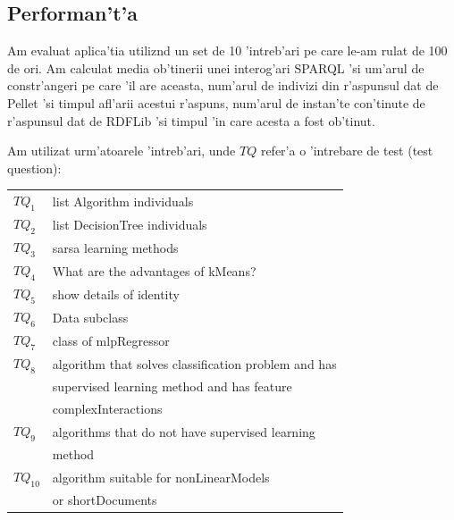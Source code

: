 \documentclass[12pt,a4paper,twoside]{report}
\begin{document}
\subsection{Performan't'a}

Am evaluat aplica'tia utiliz\ia nd un set de 10 'intreb'ari pe care le-am rulat de 100 de ori. Am calculat media ob'tinerii unei interog'ari SPARQL 'si um'arul de constr'angeri pe care 'il are aceasta, num'arul de indivizi din r'aspunsul dat de Pellet 'si timpul afl'arii acestui r'aspuns, num'arul de instan'te con'tinute de r'aspunsul dat de RDFLib 'si timpul 'in care acesta a fost ob'tinut. 

Am utilizat urm'atoarele 'intreb'ari, unde $TQ$ refer'a o 'intrebare de test (test question):
\newline

\begin{small}
\begin{tabular}{ll}
$TQ_1$ & list Algorithm individuals\\
$TQ_2$ & list DecisionTree individuals\\
$TQ_3$ & sarsa learning methods\\
$TQ_4$ & What are the advantages of kMeans?\\
$TQ_5$ & show details of identity\\
$TQ_6$ & Data subclass\\
$TQ_7$ & class of mlpRegressor\\
$TQ_8$ & algorithm that solves classification problem and has\\
 & supervised learning method and has feature \\
 & complexInteractions \\
$TQ_9$ & algorithms that do not have supervised learning  \\
& method \\
$TQ_{10}$ & algorithm suitable for nonLinearModels \\
& or shortDocuments\\
\end{tabular}
\end{small}
\end{document}
